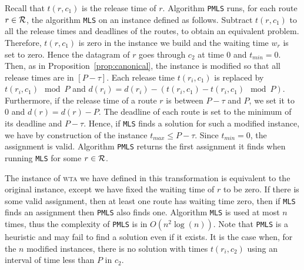 \documentclass[a4paper,10pt]{journal}
\newcommand\MLS{\texttt{MLS}\xspace}
\newcommand\PMLS{\texttt{PMLS}\xspace}
\newcommand\wta{\textsc{wta}\xspace}
\begin{document}
      Recall that $t(r,c_1)$ is the release time of $r$. Algorithm \PMLS runs, for each route $r \in \cal{R}$, the algorithm \MLS on an instance defined as follows. Subtract $t(r,c_1)$ to all the release times and deadlines of the routes, to obtain an equivalent problem. Therefore, $t(r,c_1)$ is zero in the instance we build and the waiting time $w_r$ is set to zero. Hence the datagram of $r$ goes through $c_2$ at time $0$ and $t_{min} = 0$.
     Then, as in Proposition~\ref{prop:canonical}, the instance is modified so that all release times are in $[P-\tau]$. Each release time $t(r_i,c_1)$ is replaced by $t(r_i,c_1) \mod P$ and $d(r_i) = d(r_i) - (t(r_i,c_1) - t(r_i,c_1) \mod P)$. Furthermore, if the release time of a route $r$ is between $P-\tau$ and $P$, we set it to $0$ and $d(r) = d(r) - P$.  The deadline of each route is set to the minimum of its deadline and $P - \tau$. Hence, if \MLS finds a solution for such a modified instance, we have by construction of the instance $t_{max} \leq P -\tau $. Since $t_{min} = 0$, the assignment is valid. Algorithm \PMLS
     returns the first assignment it finds when running \MLS for some $r \in \cal{R}$.

     The instance of \wta we have defined in this transformation is equivalent 
     to the original instance, except we have fixed the waiting time of 
     $r$ to be zero. If there is some valid assignment, then at least one route has waiting time zero, then if \MLS finds an assignment then \PMLS also finds one. Algorithm \MLS is used at most $n$ times, thus the complexity of \PMLS is in $O(n^2\log(n))$. Note that \PMLS is a heuristic and may fail to find a solution even if it exists. It is the case when, for the $n$ modified instances, there is no solution with times $t(r_i,c_2)$ using an interval of time less than $P$ in $c_2$. 



%   
%     
% 
%     
% 
% 
\end{document}
